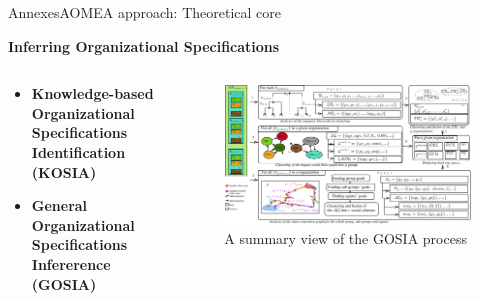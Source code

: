 \begin{frame}{Annexes}{AOMEA approach: Theoretical core}

    \textbf{Inferring Organizational Specifications}

    \begin{columns}

        \begin{column}{0.3\textwidth}

            \begin{itemize}
                \item \textbf{Knowledge-based Organizational Specifications Identification (KOSIA)}
                \item \textbf{General Organizational Specifications Infererence (GOSIA)}
            \end{itemize}

        \end{column}

        \begin{column}{0.8\textwidth}
            \begin{figure}
                \centering
                \includegraphics[width=0.95\linewidth]{figures/GOSIA_view.png}
                \caption*{A summary view of the GOSIA process}
                \label{fig:gosia_process}
            \end{figure}
        \end{column}

    \end{columns}

\end{frame}
